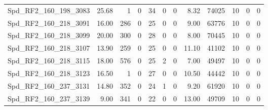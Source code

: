 \begin{longtable}[c]{@{}lrrrrrrrrrrr@{}}
Spd\_RF2\_160\_198\_3083     & 25.68                  & 1                       & 0                       & 34                     & 0                       & 0                       & 8.32                    & 74025                    & 10                       & 0                        & 0                        \\
Spd\_RF2\_160\_218\_3091     & 16.00                  & 286                     & 0                       & 25                     & 0                       & 0                       & 9.00                    & 63776                    & 10                       & 0                        & 0                        \\
Spd\_RF2\_160\_218\_3099     & 20.00                  & 300                     & 0                       & 28                     & 0                       & 0                       & 8.00                    & 70445                    & 10                       & 0                        & 0                        \\
Spd\_RF2\_160\_218\_3107     & 13.90                  & 259                     & 0                       & 25                     & 0                       & 0                       & 11.10                   & 41102                    & 10                       & 0                        & 0                        \\
Spd\_RF2\_160\_218\_3115     & 18.00                  & 576                     & 0                       & 25                     & 2                       & 0                       & 7.00                    & 49497                    & 10                       & 0                        & 0                        \\
Spd\_RF2\_160\_218\_3123     & 16.50                  & 1                       & 0                       & 27                     & 0                       & 0                       & 10.50                   & 44442                    & 10                       & 0                        & 0                        \\
Spd\_RF2\_160\_237\_3131     & 14.80                  & 352                     & 0                       & 24                     & 1                       & 0                       & 9.20                    & 61920                    & 10                       & 0                        & 0                        \\
Spd\_RF2\_160\_237\_3139     & 9.00                   & 341                     & 0                       & 22                     & 0                       & 0                       & 13.00                   & 49709                    & 10                       & 0                        & 0                        \\

\end{longtable}
